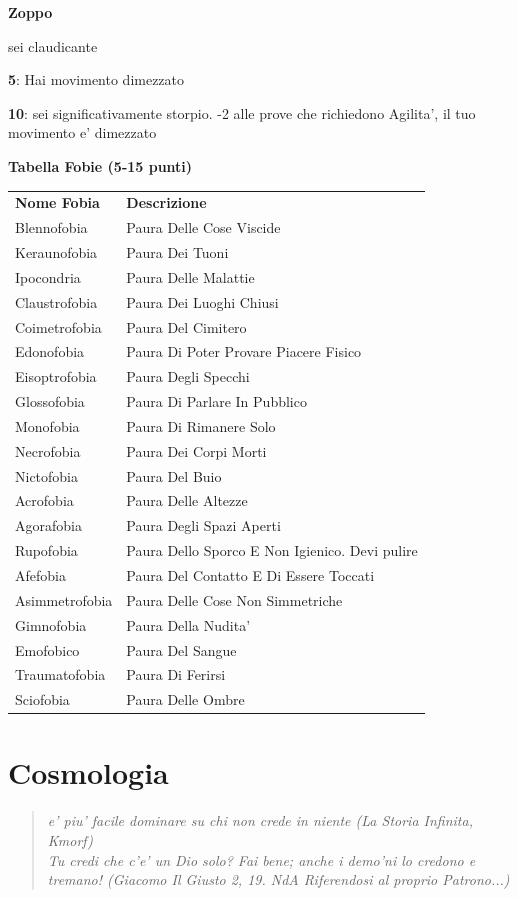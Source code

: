 \documentclass[a4paper,11pt,twoside,openany]{book}
\begin{document}
{		\textbf{Zoppo}
		
		sei claudicante
		
		\textbf{5}: Hai movimento dimezzato
		
		\textbf{10}: sei significativamente storpio. -2 alle prove che richiedono Agilita', il tuo movimento e' dimezzato
		
		\bigskip
		
		\textbf{Tabella Fobie (5-15 punti)}
		
		\begin{tabular}{L{3cm} L{13cm}}
			\toprule
			\textbf{Nome Fobia} & \textbf{Descrizione}\tabularnewline
			Blennofobia & Paura Delle Cose Viscide\tabularnewline
			Keraunofobia & Paura Dei Tuoni\tabularnewline
			Ipocondria & Paura Delle Malattie\tabularnewline
			Claustrofobia & Paura Dei Luoghi Chiusi\tabularnewline
			Coimetrofobia & Paura Del Cimitero\tabularnewline
			Edonofobia & Paura Di Poter Provare Piacere Fisico\tabularnewline
			Eisoptrofobia & Paura Degli Specchi\tabularnewline
			Glossofobia & Paura Di Parlare In Pubblico\tabularnewline
			Monofobia & Paura Di Rimanere Solo\tabularnewline
			Necrofobia & Paura Dei Corpi Morti\tabularnewline
			Nictofobia & Paura Del Buio\tabularnewline
			Acrofobia & Paura Delle Altezze\tabularnewline
			Agorafobia & Paura Degli Spazi Aperti\tabularnewline
			Rupofobia & Paura Dello Sporco E Non Igienico. Devi pulire\tabularnewline
			Afefobia & Paura Del Contatto E Di Essere Toccati\tabularnewline
			Asimmetrofobia & Paura Delle Cose Non Simmetriche\tabularnewline
			Gimnofobia & Paura Della Nudita'\tabularnewline
			Emofobico & Paura Del Sangue\tabularnewline
			Traumatofobia & Paura Di Ferirsi\tabularnewline
			Sciofobia & Paura Delle Ombre\tabularnewline
		\end{tabular}
		
		\pagebreak
		
		\section{Cosmologia}
		
		\label{cosmologia}
		\begin{quote}\textit{
				e' piu' facile dominare su chi non crede in niente (La Storia Infinita, Kmorf)\\
				Tu credi che c'e' un Dio solo? Fai bene; anche i demo'ni lo credono e tremano! (Giacomo Il Giusto 2, 19. NdA Riferendosi al proprio Patrono...)
		}\end{quote}
		
}
\end{document}
